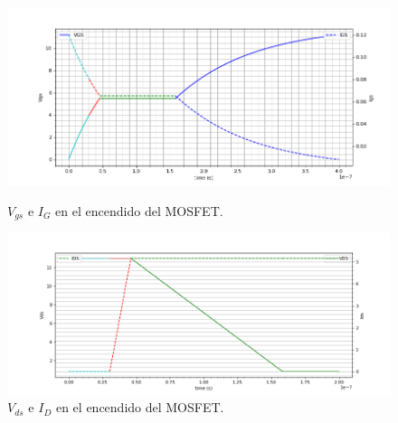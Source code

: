 \begin{figure}[H]
	\centering
	\begin{minipage}{0.45\textwidth}
		\centering	
		\includegraphics[width=\linewidth]{ImagenesEjercicio-1/encendido_gate}
		\caption{$V_{gs}$ e $I_G$ en el encendido del MOSFET.}
		\label{ej1:fig:encendido_gate}
	\end{minipage}\hfill
	\begin{minipage}{0.45\textwidth}
		\centering
		\includegraphics[width=\linewidth]{ImagenesEjercicio-1/encendido_drain}
		\caption{$V_{ds}$ e $I_D$ en el encendido del MOSFET.}
		\label{ej1:fig:encendido_drain}
	\end{minipage}\hfill
\end{figure}
